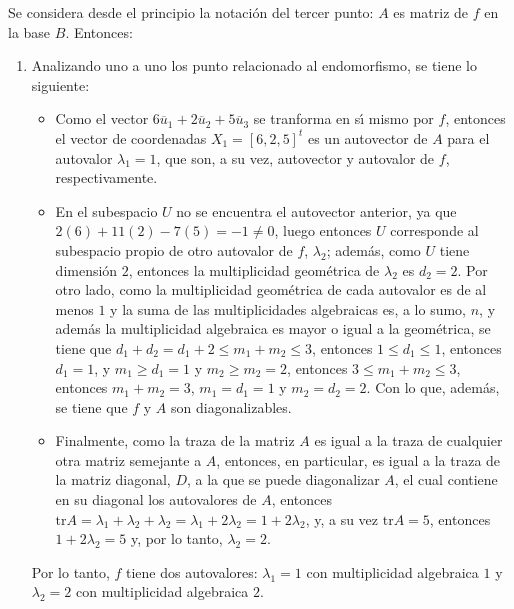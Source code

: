 \begin{solucion}
 Se considera desde el principio la notaci\'on del tercer punto: $A$ es matriz de $f$ en la base $B$. Entonces:
 \begin{enumerate}[$a$)]
  \item Analizando uno a uno los punto relacionado al endomorfismo, se tiene lo siguiente:
  \begin{itemize}
   \item Como el vector $6\overline{u}_1 + 2\overline{u}_2 + 5\overline{u}_3$ se tranforma en s\'{\i} mismo por $f$, entonces el vector de coordenadas $X_1 = [6,2,5]^t$ es un autovector de $A$ para el autovalor $\lambda_1 = 1$, que son, a su vez, autovector y autovalor de $f$, respectivamente.
   
   \item En el subespacio $U$ no se encuentra el autovector anterior, ya que $2(6)+11(2)-7(5)=-1 \neq 0$, luego entonces $U$ corresponde al subespacio propio de otro autovalor de $f$, $\lambda_2$; adem\'as, como $U$ tiene dimensi\'on $2$, entonces la multiplicidad geom\'etrica de $\lambda_2$ es $d_2 = 2$. Por otro lado, como la multiplicidad geom\'etrica de cada autovalor es de al menos $1$ y la suma de las multiplicidades algebraicas es, a lo sumo, $n$, y adem\'as la multiplicidad algebraica es mayor o igual a la geom\'etrica, se tiene que $d_1 + d_2 = d_1 + 2 \leq m_1 + m_2 \leq 3$, entonces $1 \leq d_1 \leq 1$, entonces $d_1 = 1$, y $m_1 \geq d_1 = 1$ y $m_2 \geq m_2 = 2$, entonces $3 \leq m_1+m_2 \leq 3$, entonces $m_1 + m_2 = 3$, $m_1 = d_1 = 1$ y $m_2 = d_2 = 2$. Con lo que, adem\'as, se tiene que $f$ y $A$ son diagonalizables.

   \item Finalmente, como la traza de la matriz $A$ es igual a la traza de cualquier otra matriz semejante a $A$, entonces, en particular, es igual a la traza de la matriz diagonal, $D$, a la que se puede diagonalizar $A$, el cual contiene en su diagonal los autovalores de $A$, entonces $\text{tr} A = \lambda_1 + \lambda_2 + \lambda_2 = \lambda_1 + 2\lambda_2 = 1 + 2\lambda_2$, y, a su vez $\text{tr} A = 5$, entonces $1 + 2\lambda_2 = 5$ y, por lo tanto, $\lambda_2 = 2$.
  \end{itemize}
  Por lo tanto, $f$ tiene dos autovalores: $\lambda_1 = 1$ con multiplicidad algebraica $1$ y $\lambda_2 = 2$ con multiplicidad algebraica $2$.
  

\end{enumerate}
\end{solucion}
